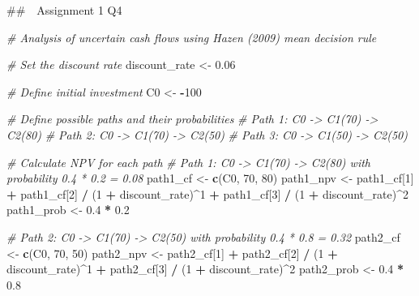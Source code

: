 \documentclass[
]{article}
\newenvironment{Shaded}{\begin{snugshade}}{\end{snugshade}}
\newcommand{\CommentTok}[1]{\textcolor[rgb]{0.56,0.35,0.01}{\textit{#1}}}
\newcommand{\DecValTok}[1]{\textcolor[rgb]{0.00,0.00,0.81}{#1}}
\newcommand{\FloatTok}[1]{\textcolor[rgb]{0.00,0.00,0.81}{#1}}
\newcommand{\FunctionTok}[1]{\textcolor[rgb]{0.13,0.29,0.53}{\textbf{#1}}}
\newcommand{\NormalTok}[1]{#1}
\newcommand{\OtherTok}[1]{\textcolor[rgb]{0.56,0.35,0.01}{#1}}
\newcommand{\SpecialCharTok}[1]{\textcolor[rgb]{0.81,0.36,0.00}{\textbf{#1}}}
\begin{document}
\#\#　Assignment 1 Q4

\begin{Shaded}
\begin{Highlighting}[]
\CommentTok{\# Analysis of uncertain cash flows using Hazen (2009) mean decision rule}

\CommentTok{\# Set the discount rate}
\NormalTok{discount\_rate }\OtherTok{\textless{}{-}} \FloatTok{0.06}

\CommentTok{\# Define initial investment}
\NormalTok{C0 }\OtherTok{\textless{}{-}} \SpecialCharTok{{-}}\DecValTok{100}

\CommentTok{\# Define possible paths and their probabilities}
\CommentTok{\# Path 1: C0 {-}\textgreater{} C1(70) {-}\textgreater{} C2(80)}
\CommentTok{\# Path 2: C0 {-}\textgreater{} C1(70) {-}\textgreater{} C2(50)}
\CommentTok{\# Path 3: C0 {-}\textgreater{} C1(50) {-}\textgreater{} C2(50)}

\CommentTok{\# Calculate NPV for each path}
\CommentTok{\# Path 1: C0 {-}\textgreater{} C1(70) {-}\textgreater{} C2(80) with probability 0.4 * 0.2 = 0.08}
\NormalTok{path1\_cf }\OtherTok{\textless{}{-}} \FunctionTok{c}\NormalTok{(C0, }\DecValTok{70}\NormalTok{, }\DecValTok{80}\NormalTok{)}
\NormalTok{path1\_npv }\OtherTok{\textless{}{-}}\NormalTok{ path1\_cf[}\DecValTok{1}\NormalTok{] }\SpecialCharTok{+} 
\NormalTok{             path1\_cf[}\DecValTok{2}\NormalTok{] }\SpecialCharTok{/}\NormalTok{ (}\DecValTok{1} \SpecialCharTok{+}\NormalTok{ discount\_rate)}\SpecialCharTok{\^{}}\DecValTok{1} \SpecialCharTok{+} 
\NormalTok{             path1\_cf[}\DecValTok{3}\NormalTok{] }\SpecialCharTok{/}\NormalTok{ (}\DecValTok{1} \SpecialCharTok{+}\NormalTok{ discount\_rate)}\SpecialCharTok{\^{}}\DecValTok{2}
\NormalTok{path1\_prob }\OtherTok{\textless{}{-}} \FloatTok{0.4} \SpecialCharTok{*} \FloatTok{0.2}

\CommentTok{\# Path 2: C0 {-}\textgreater{} C1(70) {-}\textgreater{} C2(50) with probability 0.4 * 0.8 = 0.32}
\NormalTok{path2\_cf }\OtherTok{\textless{}{-}} \FunctionTok{c}\NormalTok{(C0, }\DecValTok{70}\NormalTok{, }\DecValTok{50}\NormalTok{)}
\NormalTok{path2\_npv }\OtherTok{\textless{}{-}}\NormalTok{ path2\_cf[}\DecValTok{1}\NormalTok{] }\SpecialCharTok{+} 
\NormalTok{             path2\_cf[}\DecValTok{2}\NormalTok{] }\SpecialCharTok{/}\NormalTok{ (}\DecValTok{1} \SpecialCharTok{+}\NormalTok{ discount\_rate)}\SpecialCharTok{\^{}}\DecValTok{1} \SpecialCharTok{+} 
\NormalTok{             path2\_cf[}\DecValTok{3}\NormalTok{] }\SpecialCharTok{/}\NormalTok{ (}\DecValTok{1} \SpecialCharTok{+}\NormalTok{ discount\_rate)}\SpecialCharTok{\^{}}\DecValTok{2}
\NormalTok{path2\_prob }\OtherTok{\textless{}{-}} \FloatTok{0.4} \SpecialCharTok{*} \FloatTok{0.8}


\end{Highlighting}
\end{Shaded}
\end{document}
